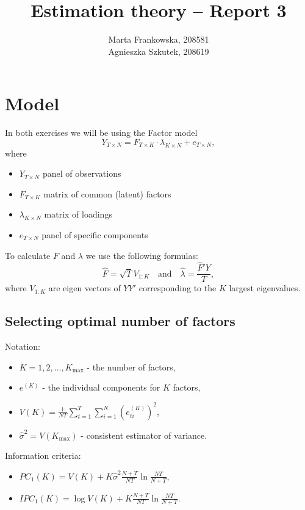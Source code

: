 \documentclass[12pt, a4paper]{article}\usepackage[]{graphicx}\usepackage[]{color}
\begin{document}
\title{Estimation theory -- Report 3}
\author{Marta Frankowska, 208581 \\ Agnieszka Szkutek, 208619}
\maketitle
\tableofcontents 


\section{Model}
In both exercises we will be using the Factor model
\[ Y_{T\times N} = F_{T\times K} \cdot \lambda_{K\times N} + e_{T\times N},\]
where 
\begin{itemize}
  \item $Y_{T\times N}$ panel of observations
  \item $F_{T\times K}$ matrix of common (latent) factors
  \item $\lambda_{K\times N}$ matrix of loadings
  \item $e_{T\times N}$ panel of specific components
\end{itemize}

To calculate $F$ and $\lambda$ we use the following formulas:
\[ \hat{F} = \sqrt{T} V_{1:K} \quad\text{and}\quad \hat{\lambda} = \frac{\hat{F}' Y}{T},\]
where $V_{1:K}$ are eigen vectors of $YY'$ corresponding to the $K$ largest eigenvalues.


\subsection{Selecting optimal number of factors}
Notation:
\begin{itemize}
  \item $K = 1,2,\dots,K_\text{max}$ - the number of factors,
  \item $e^{(K)}$ - the individual components for $K$ factors,
  \item $V(K) = \frac{1}{NT}\sum_{t=1}^{T} \sum_{i=1}^{N} \left( e^{(K)}_{t i} \right)^2$,
  \item $\hat{\sigma}^2 = V(K_\text{max})$ - consistent estimator of variance.
\end{itemize}

Information criteria:
\begin{itemize}
  \item $PC_1(K) = V(K) + K \hat{\sigma}^2 \frac{N+T}{NT} \ln{\frac{NT}{N+T}}$,
  \item $IPC_1(K) = \log{V(K)} + K\frac{N+T}{NT} \ln{\frac{NT}{N+T}}$.
\end{itemize}
\end{document}
